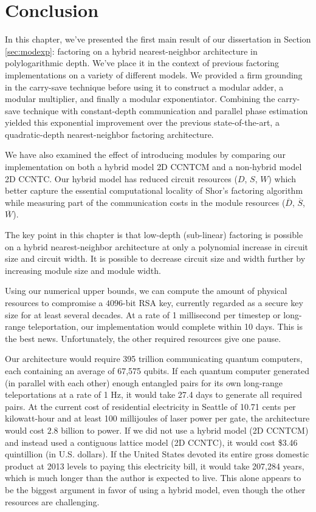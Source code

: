 \section{Conclusion}
\label{sec:fpl-conclude}

In this chapter, we've presented the first main result of
our dissertation in Section \ref{sec:modexp}:
factoring on a hybrid nearest-neighbor architecture in polylogarithmic depth.
We've place it in the context of previous factoring implementations on a
variety of different models. We provided a firm grounding
in the carry-save technique before using it to construct
a modular adder, a modular multiplier, and finally a
modular exponentiator. Combining the carry-save technique
with constant-depth
communication and parallel phase estimation yielded
this exponential improvement over the previous
state-of-the-art, a quadratic-depth nearest-neighbor
factoring architecture.

We have also examined the
effect of introducing modules by comparing our
implementation on both a hybrid model \textsf{2D CCNTCM}
and a non-hybrid model \textsf{2D CCNTC}.
Our hybrid model has reduced circuit resources
($D$, $S$, $W$) which better
capture the essential computational locality of Shor's factoring
algorithm while measuring part of the communication
costs in the module resources ($\overline{D}$, $\overline{S}$, $\overline{W}$).

The key point in this chapter is that
low-depth (sub-linear) factoring is possible
on a hybrid nearest-neighbor architecture
at only a polynomial increase in circuit size
and 
circuit width. It is possible to decrease
circuit size and width further by increasing
module size and module width.

Using our numerical
upper bounds, we can compute the amount of
physical resources to compromise a $4096$-bit
RSA key, currently regarded as a secure key size
for at least several decades. At a rate of
1 millisecond per timestep or long-range
teleportation, our implementation would
complete within 10 days. This is the best news.
Unfortunately, the other required resources
give one pause.

 Our architecture
would require 395 trillion communicating quantum
computers, each containing an average of
67,575 qubits. If each quantum computer generated
(in parallel with each other)
enough entangled pairs for its own long-range
teleportations at a rate of 1 Hz, it would
take 27.4 days to generate all required pairs.
At the current cost of residential electricity 
in Seattle of 10.71 cents per kilowatt-hour and
at least 100 millijoules of laser
power per gate,
the architecture would cost $2.8$ billion
to power. If we did not use a hybrid model
(\textsf{2D CCNTCM}) and instead used a
contiguous lattice model (\textsf{2D CCNTC}),
it would cost \$3.46 quintillion (in U.S. dollars).
If the United States devoted its entire gross domestic
product at 2013 levels to paying this electricity bill,
it would take 207,284 years, which is much longer than
the author is expected to live. This alone appears
to be the biggest argument in favor of using
a hybrid model, even though the other resources
are challenging.

